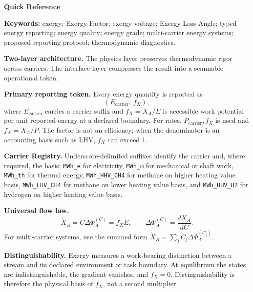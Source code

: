 \documentclass[11pt]{article}
\newif\ifpreprintquickreference
\newcommand{\fx}{f_X}
\newcommand{\XA}{X_A}
\newcommand{\XdotA}{\dot{X}_A}
\newcommand{\carrier}{\mathrm{carrier}}
\begin{document}
\ifpreprintquickreference
\newpage
\begin{tcolorbox}[colback=white,colframe=black,arc=1.2mm,boxrule=0.8pt,left=8pt,right=8pt,top=6pt,bottom=6pt]
\footnotesize
\setlength{\parskip}{0.1em}
\setlength{\abovedisplayskip}{0.25em}
\setlength{\belowdisplayskip}{0.25em}
{\centering\Large\bfseries Quick Reference\par}\vspace{0.4em}
\textbf{Keywords:} exergy; Exergy Factor; exergy voltage; Exergy Loss Angle; typed energy reporting; energy quality; energy grade; multi-carrier energy systems; proposed reporting protocol; thermodynamic diagnostics.\par\vspace{0.4em}

\textbf{Two-layer architecture.} The physics layer preserves thermodynamic rigor across carriers. The interface layer compresses the result into a scannable operational token.

\textbf{Primary reporting token.} Every energy quantity is reported as
\begin{equation*}
(E_{\carrier},\,\fx),
\end{equation*}
where $E_{\carrier}$ carries a carrier suffix and $\fx=\XA/E$ is accessible work potential per unit reported energy at a declared boundary. For rates, $P_{\carrier},\fx$ is used and $\fx=\XdotA/P$. The factor is not an efficiency; when the denominator is an accounting basis such as LHV, $\fx$ can exceed 1.

\textbf{Carrier Registry.} Underscore-delimited suffixes identify the carrier and, where required, the basis: \texttt{MWh\_e} for electricity, \texttt{MWh\_m} for mechanical or shaft work, \texttt{MWh\_th} for thermal energy, \texttt{MWh\_HHV\_CH4} for methane on higher heating value basis, \texttt{MWh\_LHV\_CH4} for methane on lower heating value basis, and \texttt{MWh\_HHV\_H2} for hydrogen on higher heating value basis.

\textbf{Universal flow law.}
\begin{equation*}
\XdotA = \dot{C}\Delta\Phi_A^{(C)} = \fx\dot{E},\qquad \Delta\Phi_A^{(C)}=\frac{d\XA}{dC}.
\end{equation*}
For multi-carrier systems, use the summed form $\XdotA = \sum_j \dot{C}_j\Delta\Phi_A^{(C_j)}$.

\textbf{Distinguishability.} Exergy measures a work-bearing distinction between a stream and its declared environment or task boundary. At equilibrium the states are indistinguishable, the gradient vanishes, and $\fx=0$. Distinguishability is therefore the physical basis of $\fx$, not a second multiplier.


\end{tcolorbox}
\end{document}

